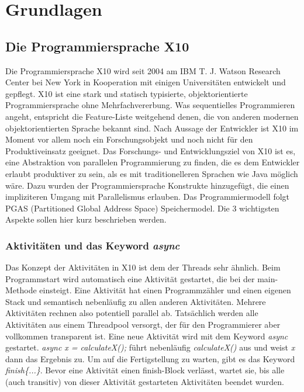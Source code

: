 \chapter{Grundlagen} %
\label{cha:grundlagen}

\section{Die Programmiersprache X10} %
\label{sec:die_programmiersprache_x10}
Die Programmiersprache X10 wird seit 2004 am IBM T. J. Watson Research Center bei New York in Kooperation mit einigen Universitäten entwickelt und gepflegt. X10 ist eine stark und statisch typisierte, objektorientierte Programmiersprache ohne Mehrfachvererbung. Was sequentielles Programmieren angeht, entspricht die Feature-Liste weitgehend denen, die von anderen modernen objektorientierten Sprache bekannt sind. Nach Aussage der Entwickler ist X10 im Moment vor allem noch ein Forschungsobjekt und noch nicht für den Produktiveinsatz geeignet. Das Forschungs- und Entwicklungsziel von X10 ist es, eine Abstraktion von parallelen Programmierung zu finden, die es dem Entwickler erlaubt produktiver zu sein, als es mit traditionelleren Sprachen wie Java möglich wäre. Dazu wurden der Programmiersprache Konstrukte hinzugefügt, die einen impliziteren Umgang mit Parallelismus erlauben. Das Programmiermodell folgt PGAS (Partitioned Global Address Space) Speichermodel. Die 3 wichtigsten Aspekte sollen hier kurz beschrieben werden.\cite{x10FAQ:2012:Online}

\subsection{Aktivitäten und das Keyword \textit{async}}  %
\label{sub:aktivitaeten_und_das_keyword_async}
Das Konzept der Aktivitäten in X10 ist dem der Threads sehr ähnlich. Beim Programmstart wird automatisch eine Aktivität gestartet, die bei der main-Methode einsteigt. Eine Aktivität hat einen Programmzähler und einen eigenen Stack und semantisch nebenläufig zu allen anderen Aktivitäten. Mehrere Aktivitäten rechnen also potentiell parallel ab. Tatsächlich werden alle Aktivitäten aus einem Threadpool versorgt, der für den Programmierer aber vollkommen transparent ist. Eine neue Aktivität wird mit dem Keyword \textit{async} gestartet. \textit{ async x = calculateX();} führt nebenläufig \textit{calculateX()} aus und weist \textit{x} dann das Ergebnis zu. Um auf die Fertigstellung zu warten, gibt es das Keyword \textit{finish\{...\}}. Bevor eine Aktivität einen finish-Block verlässt, wartet sie, bis alle (auch transitiv) von dieser Aktivität gestarteten Aktivitäten beendet wurden.\cite{x10Spec:2012:Online}

